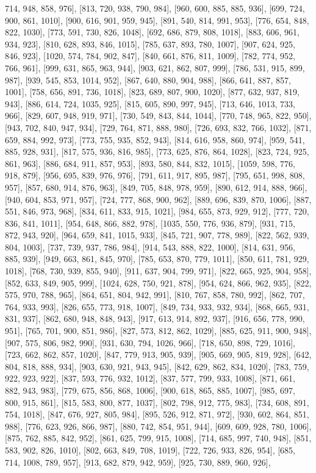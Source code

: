 714, 948, 858, 976], [813, 720, 938, 790, 984], [960, 600, 885, 885, 936], [699, 724, 900, 861, 1010], [900, 616, 901, 959, 945], [891, 540, 814, 991, 953], [776, 654, 848, 822, 1030], [773, 591, 730, 826, 1048], [692, 686, 879, 808, 1018], [883, 606, 961, 934, 923], [810, 628, 893, 846, 1015], [785, 637, 893, 780, 1007], [907, 624, 925, 846, 923], [1020, 574, 784, 902, 847], [840, 661, 876, 811, 1009], [782, 774, 952, 766, 961], [999, 631, 865, 963, 944], [903, 621, 862, 807, 999], [786, 531, 915, 899, 987], [939, 545, 853, 1014, 952], [867, 640, 880, 904, 988], [866, 641, 887, 857, 1001], [758, 656, 891, 736, 1018], [823, 689, 807, 900, 1020], [877, 632, 937, 819, 943], [886, 614, 724, 1035, 925], [815, 605, 890, 997, 945], [713, 646, 1013, 733, 966], [829, 607, 948, 919, 971], [730, 549, 843, 844, 1044], [770, 748, 965, 822, 950], [943, 702, 840, 947, 934], [729, 764, 871, 888, 980], [726, 693, 832, 766, 1032], [871, 659, 884, 992, 973], [773, 755, 935, 852, 943], [814, 616, 958, 860, 974], [959, 541, 885, 928, 931], [817, 575, 936, 816, 985], [773, 625, 876, 864, 1028], [823, 724, 925, 861, 963], [886, 684, 911, 857, 953], [893, 580, 844, 832, 1015], [1059, 598, 776, 918, 879], [956, 695, 839, 976, 976], [791, 611, 917, 895, 987], [795, 651, 998, 808, 957], [857, 680, 914, 876, 963], [849, 705, 848, 978, 959], [890, 612, 914, 888, 966], [940, 604, 853, 971, 957], [724, 777, 868, 900, 962], [889, 696, 839, 870, 1006], [887, 551, 846, 973, 968], [834, 611, 833, 915, 1021], [984, 655, 873, 929, 912], [777, 720, 836, 841, 1011], [954, 648, 866, 882, 978], [1035, 550, 776, 936, 879], [931, 715, 872, 943, 920], [964, 659, 841, 1015, 933], [845, 721, 907, 778, 989], [822, 562, 939, 804, 1003], [737, 739, 937, 786, 984], [914, 543, 888, 822, 1000], [814, 631, 956, 885, 939], [949, 663, 861, 845, 970], [785, 653, 870, 779, 1011], [850, 611, 781, 929, 1018], [768, 730, 939, 855, 940], [911, 637, 904, 799, 971], [822, 665, 925, 904, 958], [852, 633, 849, 905, 999], [1024, 628, 750, 921, 878], [954, 624, 866, 962, 935], [822, 575, 970, 788, 965], [864, 651, 804, 942, 991], [810, 767, 858, 780, 992], [862, 707, 764, 933, 993], [826, 655, 773, 918, 1007], [849, 734, 933, 932, 934], [868, 665, 931, 831, 937], [862, 680, 948, 848, 943], [917, 613, 914, 892, 937], [916, 656, 778, 990, 951], [765, 701, 900, 851, 986], [827, 573, 812, 862, 1029], [885, 625, 911, 900, 948], [907, 575, 806, 982, 990], [931, 630, 794, 1026, 966], [718, 650, 898, 729, 1016], [723, 662, 862, 857, 1020], [847, 779, 913, 905, 939], [905, 669, 905, 819, 928], [642, 804, 818, 888, 934], [903, 630, 921, 943, 945], [842, 629, 862, 834, 1020], [783, 759, 922, 923, 922], [837, 593, 776, 932, 1012], [837, 577, 799, 933, 1008], [871, 661, 882, 943, 983], [779, 675, 856, 868, 1006], [900, 618, 865, 885, 1007], [985, 697, 800, 915, 861], [815, 583, 800, 877, 1037], [802, 798, 912, 775, 983], [734, 608, 891, 754, 1018], [847, 676, 927, 805, 984], [895, 526, 912, 871, 972], [930, 602, 864, 851, 988], [776, 623, 926, 866, 987], [880, 742, 854, 951, 944], [609, 609, 928, 780, 1006], [875, 762, 885, 842, 952], [861, 625, 799, 915, 1008], [714, 685, 997, 740, 948], [851, 583, 902, 826, 1010], [802, 663, 849, 708, 1019], [722, 726, 933, 826, 954], [685, 714, 1008, 789, 957], [913, 682, 879, 942, 959], [925, 730, 889, 960, 926], 